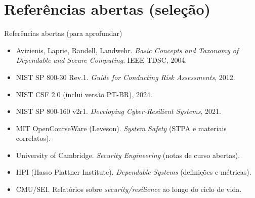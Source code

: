 \documentclass{beamer}
\begin{document}
\section*{Referências abertas (seleção)}
\begin{frame}[allowframebreaks]{Referências abertas (para aprofundar)}
\footnotesize
\begin{itemize}
  \item Avizienis, Laprie, Randell, Landwehr. \textit{Basic Concepts and Taxonomy of Dependable and Secure Computing}. IEEE TDSC, 2004.
  \item NIST SP 800-30 Rev.1. \textit{Guide for Conducting Risk Assessments}, 2012.
  \item NIST CSF 2.0 (inclui versão PT-BR), 2024.
  \item NIST SP 800-160 v2r1. \textit{Developing Cyber-Resilient Systems}, 2021.
  \item MIT OpenCourseWare (Leveson). \textit{System Safety} (STPA e materiais correlatos).
  \item University of Cambridge. \textit{Security Engineering} (notas de curso abertas).
  \item HPI (Hasso Plattner Institute). \textit{Dependable Systems} (definições e métricas).
  \item CMU/SEI. Relatórios sobre \textit{security/resilience} ao longo do ciclo de vida.
\end{itemize}

\vspace{0.4em}
\scriptsize
\end{frame}

\fi
\end{document}

